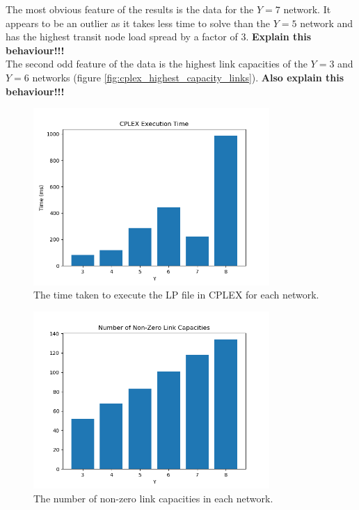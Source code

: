 \documentclass[12pt]{article} %
\begin{document}
\noindent The most obvious feature of the results is the data for the $Y=7$ network. It appears to be an outlier as it takes less time to solve than the $Y=5$ network and has the highest transit node load spread by a factor of 3. \textbf{Explain this behaviour!!!} \\

\noindent The second odd feature of the data is the highest link capacities of the $Y=3$ and $Y=6$ networks (figure \ref{fig:cplex_highest_capacity_links}). \textbf{Also explain this behaviour!!!}

\begin{figure}[H]
	\centering
	\includegraphics[width=0.8\textwidth]{cplex_data_time}
	\caption{The time taken to execute the LP file in CPLEX for each network.}
	\label{fig:cplex_time}
\end{figure}

\begin{figure}[H]
	\centering
	\includegraphics[width=0.8\textwidth]{cplex_data_num_nonzero_links}
	\caption{The number of non-zero link capacities in each network.}
	\label{fig:cplex_num_nonzero_links}
\end{figure}
\end{document}
